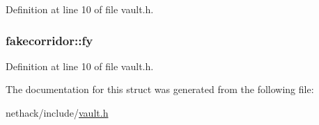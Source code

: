 Definition at line 10 of file vault.\+h.

\hypertarget{structfakecorridor_a03e2a0a63c72ecdad67272a261526020}{
\subsubsection[{fy}]{ fakecorridor\+::fy}}\label{structfakecorridor_a03e2a0a63c72ecdad67272a261526020}


Definition at line 10 of file vault.\+h.



The documentation for this struct was generated from the following file\+:\begin{DoxyCompactItemize}
\item 
nethack/include/\hyperlink{vault_8h}{vault.\+h}\end{DoxyCompactItemize}
